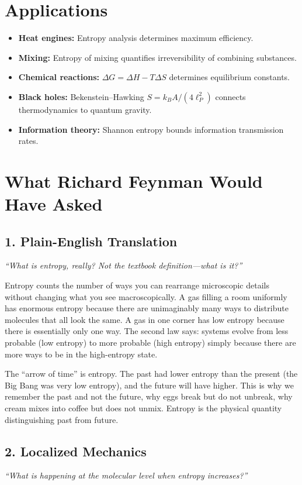 \documentclass[11pt,openright]{book}
\begin{document}
\section*{Applications}

\begin{itemize}
\item \textbf{Heat engines:} Entropy analysis determines maximum efficiency.
\item \textbf{Mixing:} Entropy of mixing quantifies irreversibility of combining substances.
\item \textbf{Chemical reactions:} $\Delta G = \Delta H - T\Delta S$ determines equilibrium constants.
\item \textbf{Black holes:} Bekenstein--Hawking $S = k_B A / (4 \ell_P^2)$ connects thermodynamics to quantum gravity.
\item \textbf{Information theory:} Shannon entropy bounds information transmission rates.
\end{itemize}
\section*{What Richard Feynman Would Have Asked}

\subsection*{1. Plain-English Translation}
\textit{``What is entropy, really? Not the textbook definition---what is it?''}

Entropy counts the number of ways you can rearrange microscopic details without changing what you see macroscopically. A gas filling a room uniformly has enormous entropy because there are unimaginably many ways to distribute molecules that all look the same. A gas in one corner has low entropy because there is essentially only one way. The second law says: systems evolve from less probable (low entropy) to more probable (high entropy) simply because there are more ways to be in the high-entropy state.

The ``arrow of time'' is entropy. The past had lower entropy than the present (the Big Bang was very low entropy), and the future will have higher. This is why we remember the past and not the future, why eggs break but do not unbreak, why cream mixes into coffee but does not unmix. Entropy is the physical quantity distinguishing past from future.

\subsection*{2. Localized Mechanics}
\textit{``What is happening at the molecular level when entropy increases?''}
\end{document}
